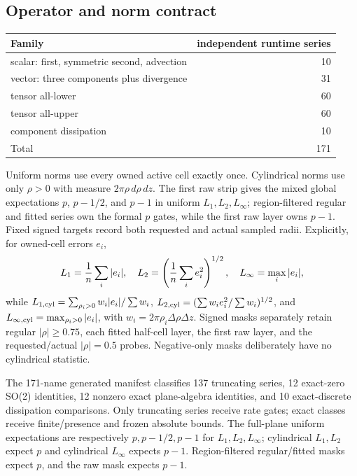\subsection{Operator and norm contract}
\begin{center}
\begin{tabular}{lr}
\toprule
Family & independent runtime series\\
\midrule
scalar: first, symmetric second, advection & 10\\
vector: three components plus divergence & 31\\
tensor all-lower & 60\\
tensor all-upper & 60\\
component dissipation & 10\\
\midrule
Total & 171\\
\bottomrule
\end{tabular}
\end{center}
Uniform norms use every owned active cell exactly once.  Cylindrical norms use only
$\rho>0$ with measure $2\pi\rho\,d\rho\,dz$.  The first raw strip gives the mixed
global expectations $p$, $p-1/2$, and $p-1$ in uniform $L_1,L_2,L_\infty$;
region-filtered regular and fitted series own the formal $p$ gates, while the first
raw layer owns $p-1$.  Fixed signed targets record both requested and actual sampled
radii.
Explicitly, for owned-cell errors $e_i$,
\[
 L_1={1\over n}\sum_i|e_i|,\quad
 L_2=\left({1\over n}\sum_i e_i^2\right)^{1/2},\quad
 L_\infty=\max_i|e_i|,
\]
while $L_{1,\rm cyl}=\sum_{\rho_i>0}w_i|e_i|/\sum w_i$,
$L_{2,\rm cyl}=(\sum w_ie_i^2/\sum w_i)^{1/2}$, and
$L_{\infty,\rm cyl}=\max_{\rho_i>0}|e_i|$, with
$w_i=2\pi\rho_i\Delta\rho\Delta z$.  Signed masks separately retain regular
$|\rho|\ge0.75$, each fitted half-cell layer, the first raw layer, and the
requested/actual $|\rho|=0.5$ probes.  Negative-only masks deliberately have no
cylindrical statistic.

The 171-name generated manifest classifies 137 truncating series, 12 exact-zero
SO(2) identities, 12 nonzero exact plane-algebra identities, and 10 exact-discrete
dissipation comparisons.  Only truncating
series receive rate gates; exact classes receive finite/presence and frozen absolute
bounds.  The full-plane uniform expectations are respectively $p,p-1/2,p-1$ for
$L_1,L_2,L_\infty$; cylindrical $L_1,L_2$ expect $p$ and cylindrical $L_\infty$
expects $p-1$.  Region-filtered regular/fitted masks expect $p$, and the raw mask
expects $p-1$.

